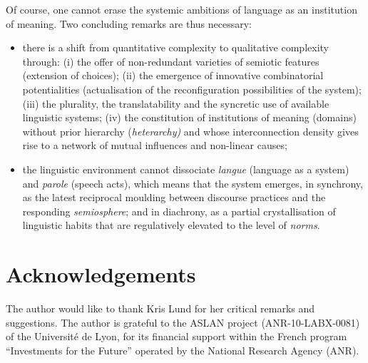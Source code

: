 \documentclass[output=paper]{langscibook}
\begin{document}
Of course, one cannot erase the systemic ambitions of language as an institution of meaning. Two concluding remarks are thus necessary: 

\begin{itemize}\sloppy
\item there is a shift from quantitative complexity to qualitative complexity through: (i) the offer of non-redundant varieties of semiotic features (extension of choices); (ii) the emergence of innovative combinatorial potentialities (actualisation of the reconfiguration possibilities of the system); (iii) the plurality, the translatability and the syncretic use of available linguistic systems; (iv) the constitution of institutions of meaning (domains) without prior hierarchy (\textit{heterarchy)} and whose interconnection density gives rise to a network of mutual influences and non-linear causes;

\item the linguistic environment cannot dissociate \textit{langue} (language as a system) and \textit{parole} (speech acts), which means that the system emerges, in synchrony, as the latest reciprocal moulding between discourse practices and the responding \textit{semiosphere}; and in diachrony, as a partial crystallisation of linguistic habits that are regulatively elevated to the level of \textit{norms}.
\end{itemize}

\section*{Acknowledgements}
The author would like to thank Kris Lund for her critical remarks and suggestions. The author is grateful to the ASLAN project (ANR-10-LABX-0081) of the Université de Lyon, for its financial support within the French program “Investments for the Future” operated by the National Research Agency (ANR).

{\sloppy\printbibliography[heading=subbibliography,notkeyword=this]}
\end{document}

